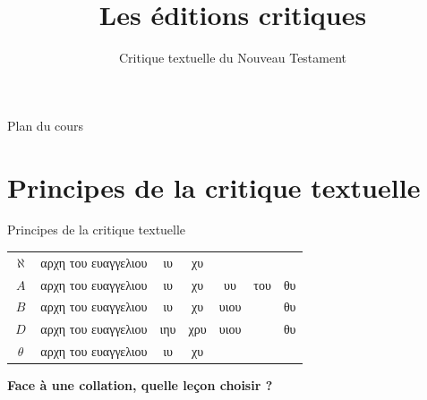 \documentclass[11pt]{beamer}
\begin{document}
\title{Les éditions critiques}
\subtitle{Critique textuelle du Nouveau Testament}

\begin{frame}{}
    \titlepage
\end{frame}

\begin{frame}{Plan du cours}
\tableofcontents
\end{frame}



\section{Principes de la critique textuelle}

\begin{frame}{Principes de la critique textuelle}
\begin{tabular}{c|c|c|c|c|c|c}
    $\aleph$ & \textgreek{αρχη του ευαγγελιου} & \textgreek{ιυ} & \textgreek{χυ} & & & \\
    $A$  & \textgreek{αρχη του ευαγγελιου} & \textgreek{ιυ}  & \textgreek{χυ} & \textgreek{υυ} & \textgreek{του} & \textgreek{θυ}\\
    $B$ & \textgreek{αρχη του ευαγγελιου} & \textgreek{ιυ} & \textgreek{χυ} & \textgreek{υιου} & & \textgreek{θυ}\\
    $D$ & \textgreek{αρχη του ευαγγελιου} & \textgreek{ιηυ} & \textgreek{χρυ} & \textgreek{υιου} & & \textgreek{θυ}\\
    $\theta$ & \textgreek{αρχη του ευαγγελιου} & \textgreek{ιυ} & \textgreek{χυ} & & & \\
\end{tabular}
\vfill
    \begin{alertblock}{}
\textbf{Face à une collation, quelle leçon choisir ?}
    \end{alertblock}
\end{frame}
\end{document}
